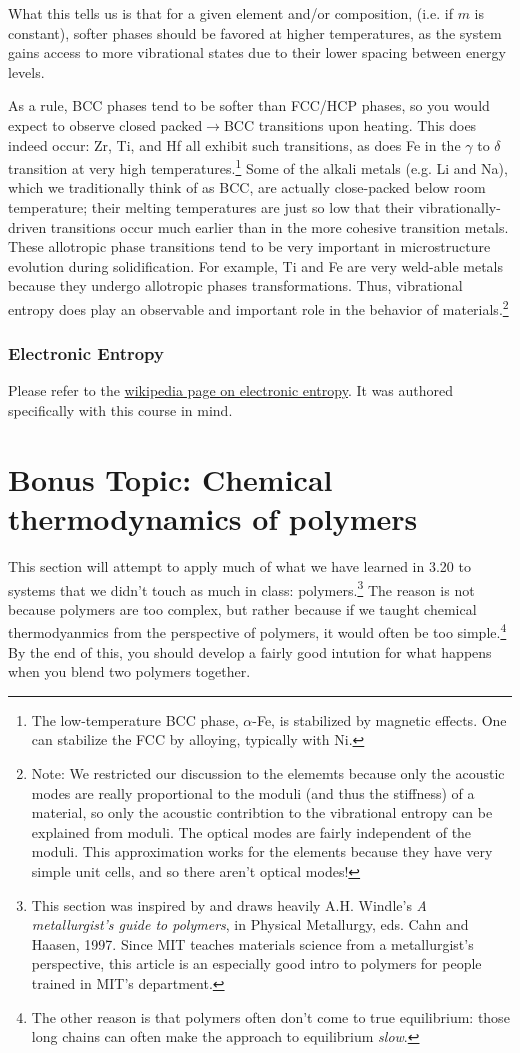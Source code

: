 \documentclass[12pt]{article}
\begin{document}
What this tells us is that for a given element and/or composition, (i.e. if $m$ is constant), softer phases should be favored at higher temperatures, as the system gains access to more vibrational states due to their lower spacing between energy levels. 

As a rule, BCC phases tend to be softer than FCC/HCP phases, so you would expect to observe closed packed$\to$BCC transitions upon heating. This does indeed occur: Zr, Ti, and Hf all exhibit such transitions, as does Fe in the $\gamma$ to $\delta$ transition at very high temperatures.\footnote{The low-temperature BCC phase, $\alpha$-Fe, is stabilized by magnetic effects. One can stabilize the FCC by alloying, typically with Ni.} Some of the alkali metals (e.g. Li and Na), which we traditionally think of as BCC, are actually close-packed below room temperature; their melting temperatures are just so low that their vibrationally-driven transitions occur much earlier than in the more cohesive transition metals. These allotropic phase transitions tend to be very important in microstructure evolution during solidification. For example, Ti and Fe are very weld-able metals because they undergo allotropic phases transformations. Thus, vibrational entropy does play an observable and important role in the behavior of materials.\footnote{Note: We restricted our discussion to the elememts because only the acoustic modes are really proportional to the moduli (and thus the stiffness) of a material, so only the acoustic contribtion to the vibrational entropy can be explained from moduli. The optical modes are fairly independent of the moduli. This approximation works for the elements because they have very simple unit cells, and so there aren't optical modes!}

\subsubsection{Electronic Entropy}
Please refer to the \href{https://en.wikipedia.org/wiki/Electronic_entropy}{wikipedia page on electronic entropy}. It was authored specifically with this course in mind.


\section{Bonus Topic: Chemical thermodynamics of polymers}
This section will attempt to apply much of what we have learned in 3.20 to systems that we didn't touch as much in class: polymers.\footnote{This section was inspired by and draws heavily A.H. Windle's \textit{A metallurgist's guide to polymers}, in Physical Metallurgy, eds. Cahn and Haasen, 1997. Since MIT teaches materials science from a metallurgist's perspective, this article is an especially good intro to polymers for people trained in MIT's department.} The reason is not because polymers are too complex, but rather because if we taught chemical thermodyanmics from the perspective of polymers, it would often be too simple.\footnote{The other reason is that polymers often don't come to true equilibrium: those long chains can often make the approach to equilibrium \emph{slow}.} By the end of this, you should develop a fairly good intution for what happens when you blend two polymers together. 
\end{document}
